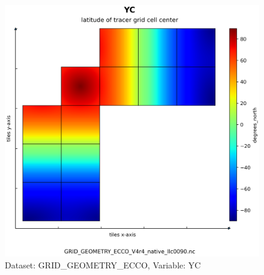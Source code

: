 \begin{figure}[H]
\centering
\includegraphics[scale=0.55]{../images/plots/native_plots_coords/Geometry_Parameters_for_the_Lat-Lon-Cap_90_(llc90)_Native_Model_Grid_(Version_4_Release_4)/YC.png}
\caption{Dataset: GRID\_GEOMETRY\_ECCO, Variable: YC}
\label{tab:table-GRID_GEOMETRY_ECCO_YC-Plot}
\end{figure}
\pagebreak
